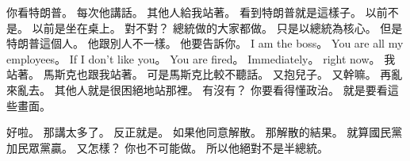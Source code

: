 \hypertarget{w01:cue:2445}{}你看特朗普。
\hypertarget{w01:cue:2446}{}每次他講話。
\hypertarget{w01:cue:2447}{}其他人給我站著。
\hypertarget{w01:cue:2448}{}看到特朗普就是這樣子。
\hypertarget{w01:cue:2449}{}以前不是。
\hypertarget{w01:cue:2450}{}以前是坐在桌上。
\hypertarget{w01:cue:2451}{}對不對？
\hypertarget{w01:cue:2452}{}總統做的大家都做。
\hypertarget{w01:cue:2453}{}只是以總統為核心。
\hypertarget{w01:cue:2454}{}但是特朗普這個人。
\hypertarget{w01:cue:2455}{}他跟別人不一樣。
\hypertarget{w01:cue:2456}{}他要告訴你。
\hypertarget{w01:cue:2457}{}I am the boss。
\hypertarget{w01:cue:2458}{}You are all my employees。
\hypertarget{w01:cue:2459}{}If I don't like you。
\hypertarget{w01:cue:2460}{}You are fired。
\hypertarget{w01:cue:2461}{}Immediately。
\hypertarget{w01:cue:2462}{}right now。
\hypertarget{w01:cue:2463}{}我站著。
\hypertarget{w01:cue:2464}{}馬斯克也跟我站著。
\hypertarget{w01:cue:2465}{}可是馬斯克比較不聽話。
\hypertarget{w01:cue:2466}{}又抱兒子。
\hypertarget{w01:cue:2467}{}又幹嘛。
\hypertarget{w01:cue:2468}{}再亂來亂去。
\hypertarget{w01:cue:2469}{}其他人就是很困絕地站那裡。
\hypertarget{w01:cue:2470}{}有沒有？
\hypertarget{w01:cue:2471}{}你要看得懂政治。
\hypertarget{w01:cue:2472}{}就是要看這些畫面。

\hypertarget{w01:cue:2473}{}好啦。
\hypertarget{w01:cue:2474}{}那講太多了。
\hypertarget{w01:cue:2475}{}反正就是。
\hypertarget{w01:cue:2476}{}如果他同意解散。
\hypertarget{w01:cue:2477}{}那解散的結果。
\hypertarget{w01:cue:2478}{}就算國民黨加民眾黨贏。
\hypertarget{w01:cue:2479}{}又怎樣？
\hypertarget{w01:cue:2480}{}你也不可能做。
\hypertarget{w01:cue:2481}{}所以他絕對不是半總統。

